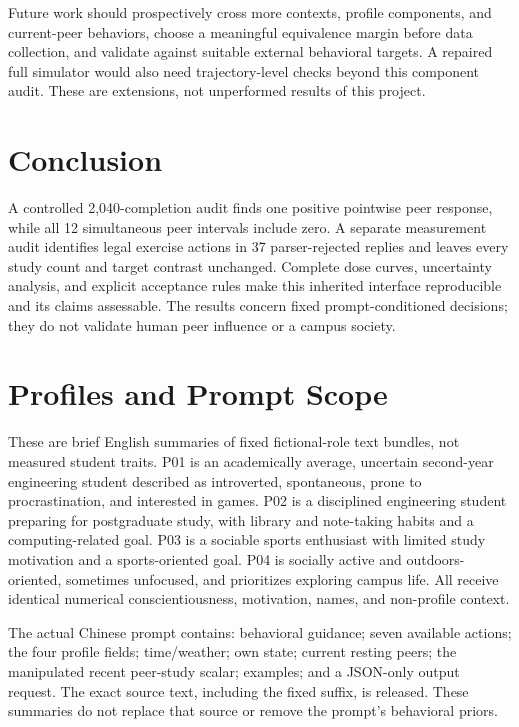 \documentclass[conference]{IEEEtran}
\begin{document}
Future work should prospectively cross more contexts, profile components, and current-peer behaviors, choose a meaningful equivalence margin before data collection, and validate against suitable external behavioral targets. A repaired full simulator would also need trajectory-level checks beyond this component audit. These are extensions, not unperformed results of this project.

\balance
\section{Conclusion}
A controlled 2,040-completion audit finds one positive pointwise peer response, while all 12 simultaneous peer intervals include zero. A separate measurement audit identifies legal exercise actions in 37 parser-rejected replies and leaves every study count and target contrast unchanged. Complete dose curves, uncertainty analysis, and explicit acceptance rules make this inherited interface reproducible and its claims assessable. The results concern fixed prompt-conditioned decisions; they do not validate human peer influence or a campus society.
\label{maintextend}

\clearpage
\balance



\clearpage
\onecolumn
\appendices
\section{Profiles and Prompt Scope}
These are brief English summaries of fixed fictional-role text bundles, not measured student traits. P01 is an academically average, uncertain second-year engineering student described as introverted, spontaneous, prone to procrastination, and interested in games. P02 is a disciplined engineering student preparing for postgraduate study, with library and note-taking habits and a computing-related goal. P03 is a sociable sports enthusiast with limited study motivation and a sports-oriented goal. P04 is socially active and outdoors-oriented, sometimes unfocused, and prioritizes exploring campus life. All receive identical numerical conscientiousness, motivation, names, and non-profile context.

The actual Chinese prompt contains: behavioral guidance; seven available actions; the four profile fields; time/weather; own state; current resting peers; the manipulated recent peer-study scalar; examples; and a JSON-only output request. The exact source text, including the fixed suffix, is released. These summaries do not replace that source or remove the prompt's behavioral priors.
\end{document}
